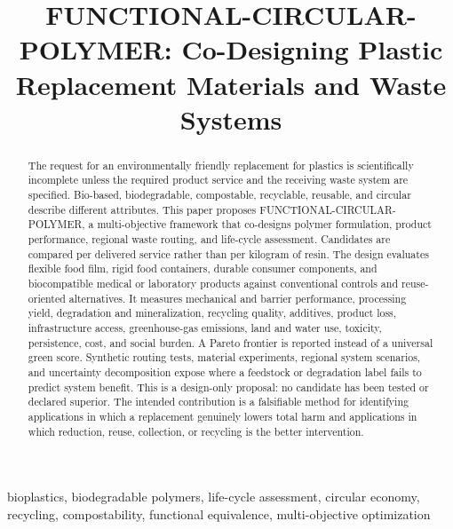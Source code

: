 \documentclass[conference]{IEEEtran}
\begin{document}
\title{FUNCTIONAL-CIRCULAR-POLYMER: Co-Designing Plastic Replacement Materials and Waste Systems}

\author{
}

\maketitle

\begin{abstract}
The request for an environmentally friendly replacement for plastics is scientifically incomplete unless the required product service and the receiving waste system are specified. Bio-based, biodegradable, compostable, recyclable, reusable, and circular describe different attributes. This paper proposes FUNCTIONAL-CIRCULAR-POLYMER, a multi-objective framework that co-designs polymer formulation, product performance, regional waste routing, and life-cycle assessment. Candidates are compared per delivered service rather than per kilogram of resin. The design evaluates flexible food film, rigid food containers, durable consumer components, and biocompatible medical or laboratory products against conventional controls and reuse-oriented alternatives. It measures mechanical and barrier performance, processing yield, degradation and mineralization, recycling quality, additives, product loss, infrastructure access, greenhouse-gas emissions, land and water use, toxicity, persistence, cost, and social burden. A Pareto frontier is reported instead of a universal green score. Synthetic routing tests, material experiments, regional system scenarios, and uncertainty decomposition expose where a feedstock or degradation label fails to predict system benefit. This is a design-only proposal: no candidate has been tested or declared superior. The intended contribution is a falsifiable method for identifying applications in which a replacement genuinely lowers total harm and applications in which reduction, reuse, collection, or recycling is the better intervention.
\end{abstract}

\begin{IEEEkeywords}
bioplastics, biodegradable polymers, life-cycle assessment, circular economy, recycling, compostability, functional equivalence, multi-objective optimization
\end{IEEEkeywords}
\end{document}

